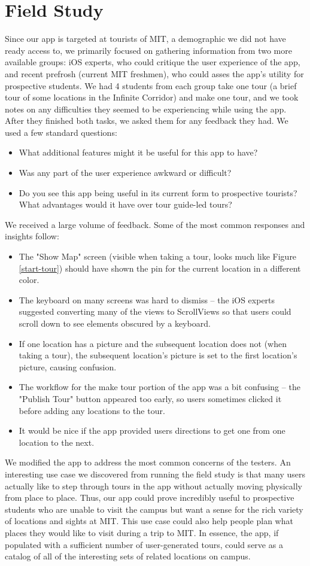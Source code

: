 \documentclass{sigchi}
\begin{document}
\section{Field Study}
Since our app is targeted at tourists of MIT, a demographic we did not have ready access to, we primarily focused on gathering information from two more available groups: iOS experts, who could critique the user experience of the app, and recent prefrosh (current MIT freshmen), who could asses the app's utility for prospective students. We had 4 students from each group take one tour (a brief tour of some locations in the Infinite Corridor) and make one tour, and we took notes on any difficulties they seemed to be experiencing while using the app. After they finished both tasks, we asked them for any feedback they had. We used a few standard questions:
\begin{itemize}
\item What additional features might it be useful for this app to have?
\item Was any part of the user experience awkward or difficult?
\item Do you see this app being useful in its current form to prospective tourists? What advantages would it have over tour guide-led tours?
\end{itemize}
We received a large volume of feedback. Some of the most common responses and insights follow:
\begin{itemize}
\item The "Show Map" screen (visible when taking a tour, looks much like Figure \ref{start-tour}) should have shown the pin for the current location in a different color.
\item The keyboard on many screens was hard to dismiss -- the iOS experts suggested converting many of the views to ScrollViews so that users could scroll down to see elements obscured by a keyboard.
\item If one location has a picture and the subsequent location does not (when taking a tour), the subsequent location's picture is set to the first location's picture, causing confusion.
\item The workflow for the make tour portion of the app was a bit confusing -- the "Publish Tour" button appeared too early, so users sometimes clicked it before adding any locations to the tour.
\item It would be nice if the app provided users directions to get one from one location to the next.
\end{itemize}
We modified the app to address the most common concerns of the testers. An interesting use case we discovered from running the field study is that many users actually like to step through tours in the app without actually moving physically from place to place. Thus, our app could prove incredibly useful to prospective students who are unable to visit the campus but want a sense for the rich variety of locations and sights at MIT. This use case could also help people plan what places they would like to visit during a trip to MIT. In essence, the app, if populated with a sufficient number of user-generated tours, could serve as a catalog of all of the interesting sets of related locations on campus.
\end{document}
